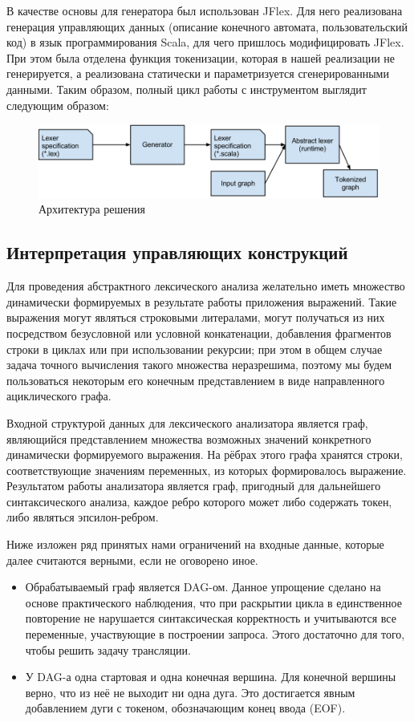 В качестве основы для генератора был использован JFlex. Для него реализована генерация управляющих 
данных (описание конечного автомата, пользовательский код) в язык 
программирования Scala, для чего пришлось модифицировать JFlex. При этом была 
отделена функция токенизации, которая в нашей реализации не генерируется, а 
реализована статически и параметризуется сгенерированными данными. Таким образом, 
полный цикл работы с инструментом выглядит следующим образом:

\begin{figure}[h]
 \centering
 \includegraphics[width=12cm]{Verbitskaya/AL_base_arch.png}
 \caption{Архитектура решения}
 \label{Arch}
\end{figure}

\subsection{Интерпретация управляющих конструкций}
Для проведения абстрактного лексического анализа желательно иметь множество 
динамически формируемых в результате работы приложения выражений. Такие выражения 
могут являться строковыми литералами, могут получаться из них посредством 
безусловной или условной конкатенации, добавления фрагментов строки в циклах 
или при использовании рекурсии; при этом в общем случае задача точного вычисления такого множества 
неразрешима, поэтому мы будем пользоваться некоторым его конечным представлением 
в виде направленного ациклического графа.

Входной структурой данных для лексического анализатора является граф, являющийся 
представлением множества возможных значений конкретного динамически формируемого 
выражения. На рёбрах этого графа хранятся строки, соответствующие значениям 
переменных, из которых формировалось выражение. Результатом работы анализатора 
является граф, пригодный для дальнейшего синтаксического анализа, каждое ребро 
которого может либо содержать токен, либо являться эпсилон-ребром.

Ниже изложен ряд принятых нами ограничений на входные данные, которые далее 
считаются верными, если не оговорено иное.
\begin{itemize}
    \item Обрабатываемый граф является DAG-ом. Данное упрощение сделано на 
    основе практического наблюдения, что при раскрытии цикла в единственное 
    повторение не нарушается синтаксическая корректность и учитываются все 
    переменные, участвующие в построении запроса. Этого достаточно для того, 
    чтобы решить задачу трансляции. 
    \item У DAG-а одна стартовая и одна конечная вершина. Для конечной вершины 
    верно, что из неё не выходит ни одна дуга. Это достигается явным добавлением 
    дуги с токеном, обозначающим конец ввода (EOF).
\end{itemize}

